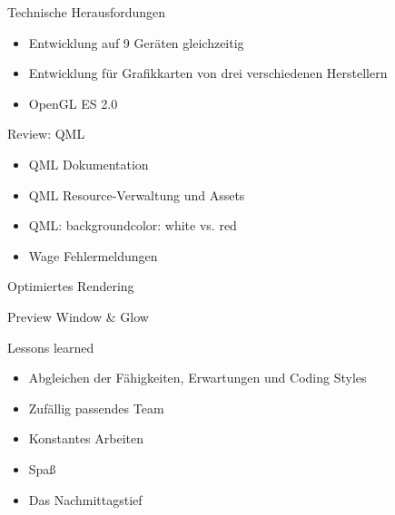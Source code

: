 \begin{frame}{Technische Herausfordungen}
	\begin{itemize}
		\item Entwicklung auf 9 Geräten gleichzeitig
		\item Entwicklung für Grafikkarten von drei verschiedenen Herstellern 
		\item OpenGL ES 2.0
	\end{itemize}
\end{frame}

\begin{frame}{Review: QML}
	\begin{itemize}
	\item QML Dokumentation
	\item QML Resource-Verwaltung und Assets
	\item QML: backgroundcolor: white vs. red
	\item Wage Fehlermeldungen
	\end{itemize}
\end{frame}

\begin{frame}{Optimiertes Rendering}

\end{frame}

\begin{frame}{Preview Window \& Glow}

\end{frame}

\begin{frame}{Lessons learned}
	\begin{itemize}
		\item Abgleichen der Fähigkeiten, Erwartungen und Coding Styles
		\item Zufällig passendes Team
		\item Konstantes Arbeiten
		\item Spaß
	\end{itemize}
	\vfill
	\begin{itemize}
		\item Das Nachmittagstief
	\end{itemize}
\end{frame}

%

